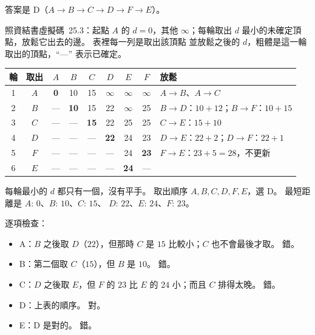 \begin{pastsoln}
答案是 D（$A \to B \to C \to D \to F \to E$）。

照資結書虛擬碼~25.3：起點 $A$ 的 $d = 0$，其他 $\infty$；每輪取出 $d$ 最小的未確定頂點，放鬆它出去的邊。 表裡每一列是取出該頂點
並放鬆之後的 $d$，粗體是這一輪取出的頂點，``---'' 表示已確定。
\begin{center}
\begin{tabular}{cc*{6}{c}l}
\toprule
輪 & 取出 & $A$ & $B$ & $C$ & $D$ & $E$ & $F$ & 放鬆 \\
\midrule
1 & $A$ & \textbf{0} & 10 & 15 & $\infty$ & $\infty$ & $\infty$ & $A \to B$、$A \to C$ \\
2 & $B$ & --- & \textbf{10} & 15 & 22 & $\infty$ & 25 & $B \to D$：$10 + 12$；$B \to F$：$10 + 15$ \\
3 & $C$ & --- & --- & \textbf{15} & 22 & 25 & 25 & $C \to E$：$15 + 10$ \\
4 & $D$ & --- & --- & --- & \textbf{22} & 24 & 23 & $D \to E$：$22 + 2$；$D \to F$：$22 + 1$ \\
5 & $F$ & --- & --- & --- & --- & 24 & \textbf{23} & $F \to E$：$23 + 5 = 28$，不更新 \\
6 & $E$ & --- & --- & --- & --- & \textbf{24} & --- & \\
\bottomrule
\end{tabular}
\end{center}
每輪最小的 $d$ 都只有一個，沒有平手。 取出順序 $A, B, C, D, F, E$，選 D。 最短距離是 $A{:}\,0$、$B{:}\,10$、$C{:}\,15$、
$D{:}\,22$、$E{:}\,24$、$F{:}\,23$。

逐項檢查：
\begin{itemize}
\item A：$B$ 之後取 $D$（$22$），但那時 $C$ 是 $15$ 比較小；$C$ 也不會最後才取。 錯。
\item B：第二個取 $C$（$15$），但 $B$ 是 $10$。 錯。
\item C：$D$ 之後取 $E$，但 $F$ 的 $23$ 比 $E$ 的 $24$ 小；而且 $C$ 排得太晚。 錯。
\item D：上表的順序。 對。
\item E：D 是對的。 錯。
\end{itemize}
\end{pastsoln}
